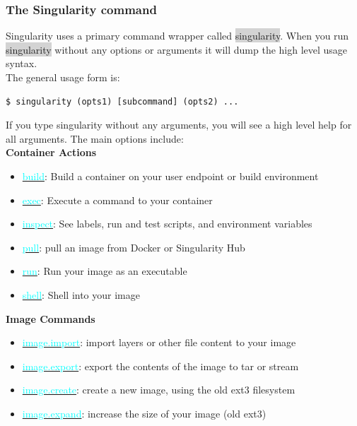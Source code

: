 \documentclass[a4paper]{article}
\begin{document}
\subsubsection{The Singularity command}

Singularity uses a primary command wrapper called \colorbox{lightgray}{singularity}. When you run \colorbox{lightgray}{singularity} without any options or arguments it will dump the high level usage syntax.\\[0.1in]

The general usage form is:

\begin{lstlisting}[frame=single]
$ singularity (opts1) [subcommand] (opts2) ...
\end{lstlisting}

If you type singularity without any arguments, you will see a high level help for all arguments. The main options include:
\\[0.1in]

\textbf{Container Actions}\\[0.1in]

\begin{itemize}
\item \hyperref[sec:build]{{\textcolor{cyan}{build}}}: Build a container on your user endpoint or build environment
\item \hyperref[sec:exec]{{\textcolor{cyan}{exec}}}: Execute a command to your container
\item \hyperref[sec:inspect]{{\textcolor{cyan}{inspect}}}: See labels, run and test scripts, and environment variables
\item \hyperref[sec:pull]{{\textcolor{cyan}{pull}}}: pull an image from Docker or Singularity Hub
\item \hyperref[sec:run]{{\textcolor{cyan}{run}}}: Run your image as an executable
\item  \hyperref[sec:shell]{{\textcolor{cyan}{shell}}}: Shell into your image
\end{itemize}

\textbf{Image Commands}\\[0.1in]

\begin{itemize}
\item \hyperref[sec:imageimport]{{\textcolor{cyan}{image.import}}}: import layers or other file content to your image
\item \hyperref[sec:imageexport]{{\textcolor{cyan}{image.export}}}: export the contents of the image to tar or stream
\item \hyperref[sec:imagecreate]{{\textcolor{cyan}{image.create}}}: create a new image, using the old ext3 filesystem
\item \hyperref[sec:imageexpand]{{\textcolor{cyan}{image.expand}}}: increase the size of your image (old ext3)
\end{itemize}
\end{document}
